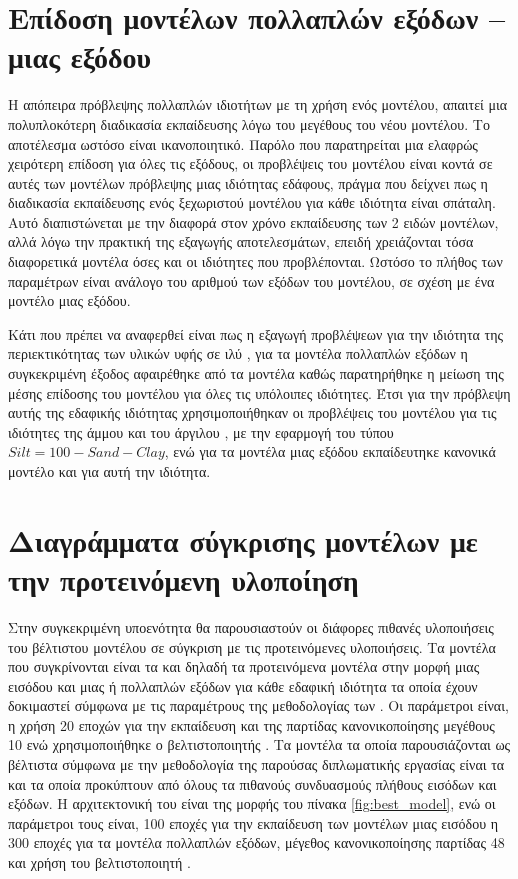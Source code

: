 \section{Επίδοση μοντέλων πολλαπλών εξόδων -- μιας εξόδου}
Η απόπειρα πρόβλεψης πολλαπλών ιδιοτήτων με τη χρήση ενός μοντέλου, απαιτεί μια πολυπλοκότερη διαδικασία εκπαίδευσης λόγω του μεγέθους του νέου μοντέλου. Το αποτέλεσμα ωστόσο είναι ικανοποιητικό. Παρόλο που παρατηρείται μια ελαφρώς χειρότερη επίδοση για όλες τις εξόδους, οι προβλέψεις του μοντέλου είναι κοντά σε αυτές των μοντέλων πρόβλεψης μιας ιδιότητας εδάφους, πράγμα που δείχνει πως η διαδικασία εκπαίδευσης ενός ξεχωριστού μοντέλου για κάθε ιδιότητα είναι σπάταλη. Αυτό διαπιστώνεται με την διαφορά στον χρόνο εκπαίδευσης των 2 ειδών μοντέλων, αλλά λόγω την πρακτική της εξαγωγής αποτελεσμάτων, επειδή χρειάζονται τόσα διαφορετικά μοντέλα όσες και οι ιδιότητες που προβλέπονται. Ωστόσο το πλήθος των παραμέτρων είναι ανάλογο του αριθμού των εξόδων του μοντέλου, σε σχέση με ένα μοντέλο μιας εξόδου.

Κάτι που πρέπει να αναφερθεί είναι πως η εξαγωγή προβλέψεων για την ιδιότητα της περιεκτικότητας των υλικών υφής σε ιλύ , για τα μοντέλα πολλαπλών εξόδων η συγκεκριμένη έξοδος αφαιρέθηκε από τα μοντέλα καθώς παρατηρήθηκε η μείωση της μέσης επίδοσης του μοντέλου για όλες τις υπόλοιπες ιδιότητες. Έτσι για την πρόβλεψη αυτής της εδαφικής ιδιότητας χρησιμοποιήθηκαν οι προβλέψεις του μοντέλου για τις ιδιότητες της άμμου  και του άργιλου , με την εφαρμογή του τύπου $Silt=100-Sand-Clay$, ενώ για τα μοντέλα μιας εξόδου εκπαίδευτηκε κανονικά μοντέλο και για αυτή την ιδιότητα.

\section{Διαγράμματα σύγκρισης μοντέλων με την προτεινόμενη υλοποίηση}

Στην συγκεκριμένη υποενότητα θα παρουσιαστούν οι διάφορες πιθανές υλοποιήσεις του βέλτιστου μοντέλου σε σύγκριση με τις προτεινόμενες υλοποιήσεις. Τα μοντέλα που συγκρίνονται είναι τα  και  δηλαδή τα προτεινόμενα μοντέλα στην μορφή μιας εισόδου και μιας ή πολλαπλών εξόδων για κάθε εδαφική ιδιότητα τα οποία έχουν δοκιμαστεί σύμφωνα με τις παραμέτρους της μεθοδολογίας των . Οι παράμετροι είναι, η χρήση 20 εποχών για την εκπαίδευση και της παρτίδας κανονικοποίησης μεγέθους 10 ενώ χρησιμοποιήθηκε ο βελτιστοποιητής . Τα μοντέλα τα οποία παρουσιάζονται ως βέλτιστα σύμφωνα με την μεθοδολογία της παρούσας διπλωματικής εργασίας είναι τα  και  τα οποία προκύπτουν από όλους τα πιθανούς συνδυασμούς πλήθους εισόδων και εξόδων. Η αρχιτεκτονική του είναι της μορφής του πίνακα \ref{fig:best_model}, ενώ οι παράμετροι τους είναι, 100 εποχές για την εκπαίδευση των μοντέλων μιας εισόδου η 300 εποχές για τα μοντέλα πολλαπλών εξόδων, μέγεθος κανονικοποίησης παρτίδας 48 και χρήση του βελτιστοποιητή .\\

